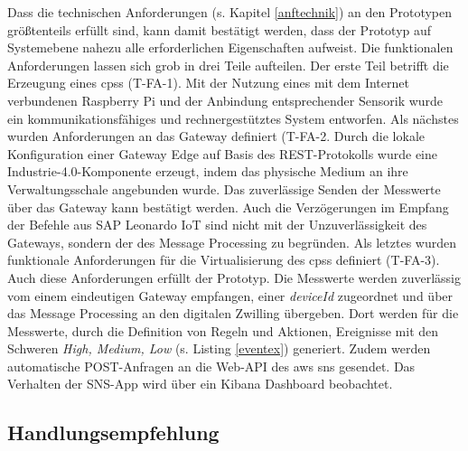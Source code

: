 Dass die technischen Anforderungen (s. Kapitel \ref{anftechnik}) an den Prototypen größtenteils erfüllt sind, kann damit bestätigt werden, dass der Prototyp auf Systemebene nahezu alle erforderlichen Eigenschaften aufweist. Die funktionalen Anforderungen lassen sich grob in drei Teile aufteilen. Der erste Teil betrifft die Erzeugung eines \ac{cpss} (T-FA-1). Mit der Nutzung eines mit dem Internet verbundenen Raspberry Pi und der Anbindung entsprechender Sensorik wurde ein kommunikationsfähiges und rechnergestütztes System entworfen. Als nächstes wurden Anforderungen an das Gateway definiert  (T-FA-2. Durch die lokale Konfiguration einer Gateway Edge auf Basis des REST-Protokolls wurde eine Industrie-4.0-Komponente erzeugt, indem das physische Medium an ihre Verwaltungsschale angebunden wurde. Das zuverlässige Senden der Messwerte über das Gateway kann bestätigt werden. Auch die Verzögerungen im Empfang der Befehle aus SAP Leonardo IoT sind nicht mit der Unzuverlässigkeit des Gateways, sondern der des Message Processing zu begründen. Als letztes wurden funktionale Anforderungen für die Virtualisierung des \ac{cpss} definiert (T-FA-3). Auch diese Anforderungen erfüllt der Prototyp. Die Messwerte werden zuverlässig vom einem eindeutigen Gateway empfangen, einer \textit{deviceId} zugeordnet und über das Message Processing an den digitalen Zwilling übergeben. Dort werden für die Messwerte, durch die Definition von Regeln und Aktionen, Ereignisse mit den Schweren \textit{High, Medium, Low} (s. Listing \ref{eventex}) generiert. Zudem werden automatische POST-Anfragen an die Web-API des \ac{aws} \ac{sns} gesendet. Das Verhalten der SNS-App wird über ein Kibana Dashboard beobachtet.  

\subsection{Handlungsempfehlung}


